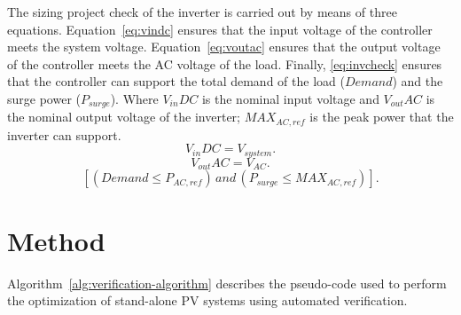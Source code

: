 \documentclass[10pt,conference]{IEEEtran}
\begin{document}
The sizing project check of the inverter is carried out by means of three equations. Equation~\eqref{eq:vindc} ensures that the input voltage of the controller meets the system voltage. Equation~\eqref{eq:voutac} ensures that the output voltage of the controller meets the AC voltage of the load. Finally, \eqref{eq:invcheck} ensures that the controller can support the total demand of the load ($Demand$) and the surge power ($P_{surge}$). Where $V_{in}DC$ is the nominal input voltage and $V_{out}AC$ is the nominal output voltage of the inverter; $MAX_{AC,ref}$ is the peak power that the inverter can support.
%
\begin{equation}
\label{eq:vindc} 
\scriptstyle V_{in}DC = \scriptstyle V_{system}.
\end{equation}
%
\begin{equation}
\label{eq:voutac} 
\scriptstyle V_{out}AC = \scriptstyle V_{AC}.
\end{equation}
%
\begin{equation}
\label{eq:invcheck} 
\left[ (\scriptstyle Demand \leq \scriptstyle P_{AC,ref}) \, \scriptstyle and \, \scriptstyle (P_{surge} \leq MAX_{AC,ref}) \right].
\end{equation}

\section{Method}
Algorithm~\ref{alg:verification-algorithm} describes the pseudo-code used to perform the optimization of stand-alone PV systems using automated verification. 
\end{document}
